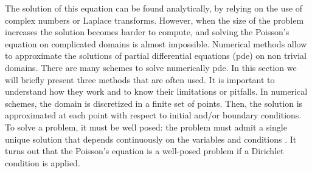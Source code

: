 \begin{refsection}
  The solution of this equation can be found analytically, by relying on the use of complex numbers or Laplace transforms. However, when the size of the problem increases the solution becomes harder to compute, and solving the Poisson's equation on complicated domains is almost impossible. Numerical methods allow to approximate the solutions of partial differential equations (\acrshort{pde}) on non trivial domains. There are many schemes to solve numerically \acrshort{pde}. In this section we will briefly present three methods that are often used. It is important to understand how they work and to know their limitations or pitfalls. In numerical schemes, the domain is discretized in a finite set of points. Then, the solution is approximated at each point with respect to initial and/or boundary conditions. To solve a problem, it must be well posed: the problem must admit a single unique solution that depends continuously on the variables and conditions \cite{Hadamard1902}. It turns out that the Poisson's equation is a well-posed problem if a Dirichlet condition is applied.


\end{refsection}
